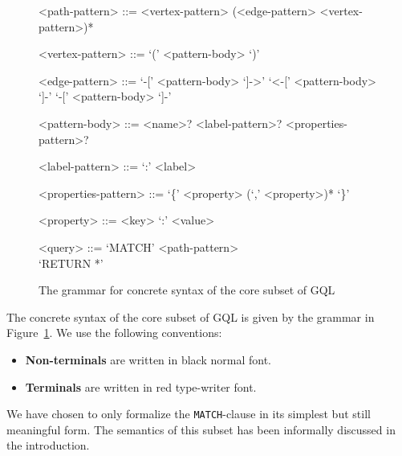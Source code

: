 \documentclass[14pt]{constructor-thesis}
\theoremstyle{definition}
\begin{document}
\begin{figure}
  \newcommand*{\myfont}{\fontfamily{lmss}\selectfont}
  \newcommand*{\myfonttt}{\fontfamily{lmtt}\selectfont}
  \renewcommand{\syntleft}{\myfont\color{black} }
  \renewcommand{\syntright}{}
  \renewcommand{\litleft}{\myfonttt\bfseries\color{red}}
  \renewcommand{\litright}{}
  \setlength{\grammarparsep}{5pt plus 1pt minus 1pt} %
  \setlength{\grammarindent}{10em} %
  \begin{tcolorbox}[colframe=gray!50!white,colback=gray!5!white,arc=0pt]
    \begin{grammar}

      <path-pattern> ::= <vertex-pattern> (<edge-pattern> <vertex-pattern>)*

      <vertex-pattern> ::= `(' <pattern-body> `)'

      <edge-pattern> ::= `-[' <pattern-body> `]->'
      \alt `<-[' <pattern-body> `]-'
      \alt `-[' <pattern-body> `]-'

      <pattern-body> ::= <name>? <label-pattern>? <properties-pattern>?

      <label-pattern> ::= `:' <label>

      <properties-pattern> ::= `\{' <property> (`,' <property>)* `\}'

      <property> ::= <key> `:' <value>

      <query> ::= `MATCH' <path-pattern> \\ `RETURN *'
      
    \end{grammar}
  \end{tcolorbox}
  \caption{The grammar for concrete syntax of the core subset of GQL}
  \label{fig:GQL-grammar}
\end{figure}

The concrete syntax of the core subset of GQL is given by the grammar in Figure~\ref{fig:GQL-grammar}. We use the following conventions:
\begin{itemize}
  \item \textbf{Non-terminals} are written in black normal font.
  \item \textbf{Terminals} are written in red type-writer font.
\end{itemize}

We have chosen to only formalize the \texttt{MATCH}-clause in its simplest but still meaningful form. The semantics of this subset has been informally discussed in the introduction.
\end{document}
